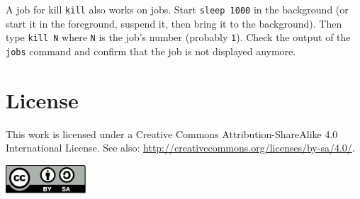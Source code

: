 \documentclass{TheAlternativeCourse}
\begin{document}
\begin{exercisebox}{A job for kill}
    \texttt{kill} also works on jobs. Start \texttt{sleep 1000} in the
    background (or start it in the foreground, suspend it, then bring it to the
    background). Then type \texttt{kill N} where \texttt{N} is the job's number
    (probably \texttt{1}). Check the output of the \texttt{jobs} command and
    confirm that the job is not displayed anymore.
\end{exercisebox}

\section{License}

This work is licensed under a Creative Commons Attribution-ShareAlike 4.0
International License. See also:
\url{http://creativecommons.org/licenses/by-sa/4.0/}.

\vspace{0cm}
\includegraphics[width=3cm]{assets/CC-BY-SA_icon.pdf}
\end{document}
